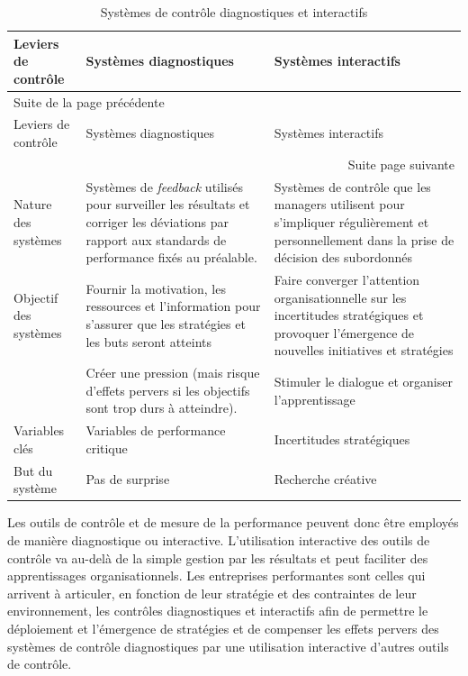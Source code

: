 \documentclass[oneside]{kaobook}
\begin{document}
{\footnotesize
\begin{longtable}{p{2cm} p{7cm} p{7cm}}
\caption{Systèmes de contrôle diagnostiques et interactifs}
\\
Leviers de contrôle & Systèmes diagnostiques & Systèmes interactifs\\
\hline
\endfirsthead
\multicolumn{3}{l}{Suite de la page précédente} \\
\hline

Leviers de contrôle & Systèmes diagnostiques & Systèmes interactifs \\

\hline
\endhead
\hline\multicolumn{3}{r}{Suite page suivante} \\
\endfoot
\endlastfoot
\hline
Nature des systèmes & Systèmes de \emph{feedback} utilisés pour surveiller les résultats et corriger les déviations par rapport aux standards de performance fixés au préalable. & Systèmes de contrôle que les managers utilisent pour s'impliquer régulièrement et personnellement dans la prise de décision des subordonnés\\
Objectif des systèmes & Fournir la motivation, les ressources et l'information pour s'assurer que les stratégies et les buts seront atteints & Faire converger l'attention organisationnelle sur les incertitudes stratégiques et provoquer l'émergence de nouvelles initiatives et stratégies\\
 & Créer une pression (mais risque d'effets pervers si les objectifs sont trop durs à atteindre). & Stimuler le dialogue et organiser l'apprentissage\\
Variables clés & Variables de performance critique & Incertitudes stratégiques\\
But du système & Pas de surprise & Recherche créative\\
\end{longtable}}

Les outils de contrôle et de mesure de la performance peuvent donc être employés de manière diagnostique ou interactive. L'utilisation interactive des outils de contrôle va au-delà de la simple gestion par les résultats et peut faciliter des apprentissages organisationnels. Les entreprises performantes sont celles qui arrivent à articuler, en fonction de leur stratégie et des contraintes de leur environnement, les contrôles diagnostiques et interactifs afin de permettre le déploiement et l'émergence de stratégies et de compenser les effets pervers des systèmes de contrôle diagnostiques par une utilisation interactive d'autres outils de contrôle.
\end{document}
